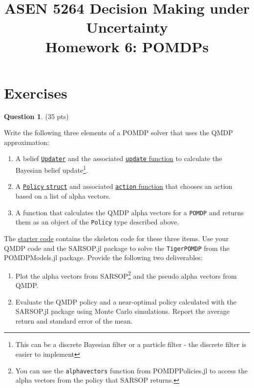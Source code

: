 \documentclass{article}
\title{ASEN 5264 Decision Making under Uncertainty\\
       Homework 6: POMDPs}
\theoremstyle{definition}
\newtheorem{question}[thm]{Question}
\begin{document}
\maketitle



\section{Exercises}

\begin{question} \label{q:tiger}
    (35 pts)

    Write the following three elements of a POMDP solver that uses the QMDP approximation:
    \begin{enumerate}[noitemsep]
        \item A belief \href{https://juliapomdp.github.io/POMDPs.jl/stable/def_updater/}{\texttt{Updater}} and the associated \href{https://juliapomdp.github.io/POMDPs.jl/stable/api/#POMDPs.update}{\texttt{update} function} to calculate the Bayesian belief update\footnote{This can be a discrete Bayesian filter or a particle filter - the discrete filter is easier to implement}.
        \item A \href{https://juliapomdp.github.io/POMDPs.jl/stable/concepts/#Solvers-and-Policies}{\texttt{Policy} \texttt{struct}} and associated \href{https://juliapomdp.github.io/POMDPs.jl/stable/api/#POMDPs.action}{\texttt{action} function} that chooses an action based on a list of alpha vectors.
        \item A function that calculates the QMDP alpha vectors for a \texttt{POMDP} and returns them as an object of the \texttt{Policy} type described above.
    \end{enumerate}
    The \href{https://github.com/zsunberg/CU-DMU-Materials/blob/master/hw/6-POMDPs/starter_code.jl}{starter code} contains the skeleton code for these three items. Use your QMDP code and the SARSOP.jl package to solve the \texttt{TigerPOMDP} from the POMDPModels.jl package. Provide the following two deliverables:
    \begin{enumerate}[label=\alph*)]
        \item Plot the alpha vectors from SARSOP\footnote{You can use the \texttt{alphavectors} function from POMDPPolicies.jl to access the alpha vectors from the policy that SARSOP returns.} and the pseudo alpha vectors from QMDP.
        \item Evaluate the QMDP policy and a near-optimal policy calculated with the SARSOP.jl package using Monte Carlo simulations. Report the average return and standard error of the mean.
    \end{enumerate}
\end{question}
\end{document}
